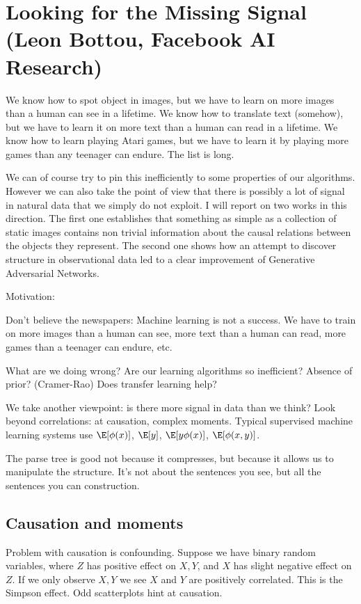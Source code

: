 \section{Looking for the Missing Signal (Leon Bottou, Facebook AI Research)}

We know how to spot object in images, but we have to learn on more images than a human can see in a lifetime. We know how to translate text (somehow), but we have to learn it on more text than a human can read in a lifetime. We know how to learn playing Atari games, but we have to learn it by playing more games than any teenager can endure. The list is long.
 
We can of course try to pin this inefficiently to some properties of our algorithms. However we can also take the point of view that there is possibly a lot of signal in natural data that we simply do not exploit. I will report on two works in this direction. The first one establishes that something as simple as a collection of static images contains non trivial information about the causal relations between the objects they represent. The second one shows how an attempt to discover structure in observational data led to a clear improvement of Generative Adversarial Networks.


Motivation: 

Don't believe the newspapers: Machine learning is not a success. We have to train on more images than a human can see, more text than a human can read, more games than a teenager can endure, etc.

What are we doing wrong? Are our learning algorithms so inefficient? Absence of prior? (Cramer-Rao)
Does transfer learning help?

We take another viewpoint: is there more signal in data than we think? 
Look beyond correlations: at causation, complex moments. Typical supervised machine learning systems use $\E[\phi(x)]$, $\E[y]$, $\E[y\phi(x)]$, $\E[\phi(x,y)]$. 

The parse tree is good not because it compresses, but because it allows us to manipulate the structure.
It's not about the sentences you see, but all the sentences you can construction.

\subsection{Causation and moments}

Problem with causation is confounding. Suppose we have binary random variables, where $Z$ has positive effect on $X,Y$, and $X$ has slight negative effect on $Z$. If we only observe $X,Y$ we see $X$ and $Y$ are positively correlated. This is the Simpson effect.
Odd scatterplots hint at causation.

